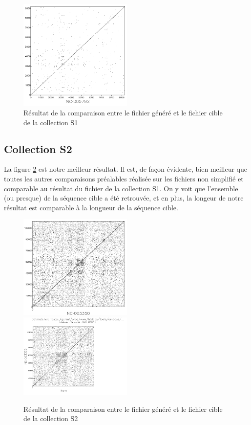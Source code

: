 \documentclass[12pt,a4paper,final]{article}
\begin{document}
\begin{figure}[!ht]
	\centering
	\includegraphics[width=0.5\textwidth]{images/collectionS1/collectionS1.png}
	\caption{\label{collS1}Résultat de la comparaison entre le fichier généré et le fichier cible de la collection S1}
\end{figure}

\subsection{Collection S2}
La figure \ref{collS2} est notre meilleur résultat. Il est, de façon évidente, bien meilleur que toutes les autres comparaisons préalables réalisée sur les fichiers non simplifié et comparable au résultat du fichier de la collection S1. On y voit que l'ensemble (ou presque) de la séquence cible a été retrouvée, et en plus, la longeur de notre résultat est comparable à la longueur de la séquence cible.

\begin{figure}[!ht]
	\centering
	\includegraphics[width=0.5\textwidth]{images/collectionS2/collectionS2.png}
	\includegraphics[width=0.5\textwidth]{images/collectionS2/collectionS2_2.png}
	\caption{\label{collS2}Résultat de la comparaison entre le fichier généré et le fichier cible de la collection S2}
\end{figure}
\end{document}

